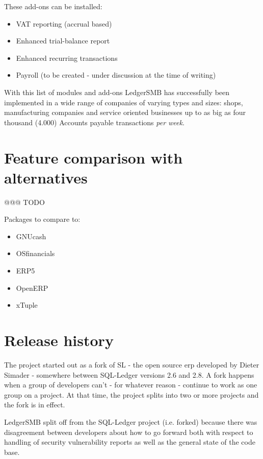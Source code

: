 These \glspl{add-on}  can be installed:
\begin{itemize}
\item VAT reporting (accrual based)
\item Enhanced trial-balance report
\item Enhanced recurring transactions
\item Payroll (to be created - under discussion at the time of writing)
\end{itemize}

With this list of modules and \glspl{add-on} LedgerSMB has successfully been implemented
in a wide range of companies of varying types and sizes: shops, manufacturing
companies and service oriented businesses up to as big as four thousand (4.000)
Accounts payable transactions \emph{per week}.

\section{Feature comparison with alternatives}
\label{sec-ledgersmb-feature-comparison}
@@@ TODO

Packages to compare to:

\begin{itemize}
\item GNUcash
\item OSfinancials
\item ERP5
\item OpenERP
\item xTuple
\end{itemize}

\section{Release history}
\label{sec-ledgersmb-release-history}

The project started out as a fork of \gls{SL} - the open source \gls{erp}
developed by Dieter Simader - somewhere between SQL-Ledger versions 2.6
and 2.8.  A fork happens when a group of developers can't - for whatever
reason - continue to work as one group on a project.  At that time, the
project splits into two or more projects and the fork is in effect.

LedgerSMB split off from the SQL-Ledger project (i.e. forked) because
there was disagreement between developers about how to go forward both with
respect to handling of security vulnerability reports as well as the general
state of the code base.

